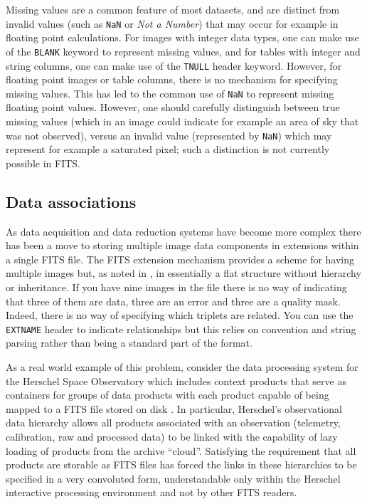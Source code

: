 \documentclass[final,authoryear,5p,times,twocolumn]{elsarticle}
\begin{document}
{{Missing values are a common feature of most datasets, and are distinct from
invalid values (such as \texttt{NaN} or \textit{Not a Number}) that may occur
for example in floating point calculations. For images with integer data
types, one can make use of the \texttt{BLANK} keyword to represent missing
values, and for tables with integer and string columns, one can make use of
the \texttt{TNULL} header keyword. However, for floating point images or
table columns, there is no mechanism for specifying missing values. This has
led to the common use of \texttt{NaN} to represent missing floating point
values. However, one should carefully distinguish between true missing values
(which in an image could indicate for example an area of sky that was not
observed), versus an invalid value (represented by \texttt{NaN}) which may
represent for example a saturated pixel; such a distinction is not currently possible
in FITS.


\subsection{Data associations}
\label{section_data_associations}


As data acquisition and data reduction systems have become more
complex there has been a move to storing multiple image data
components in extensions within a single FITS file. The FITS extension
mechanism provides a scheme for having multiple images but, as noted
in \citet{2003ASSL..285...71G}, in essentially a flat structure
without hierarchy or inheritance. If you have nine images in the file
there is no way of indicating that three of them are data, three are an error
and three are a quality mask. Indeed, there is no way of specifying which
triplets are related. You can use the \texttt{EXTNAME} header to
indicate relationships but this relies on convention and string
parsing rather than being a standard part of the format.


As a real world example of this problem, consider the data processing
system for the Herschel Space Observatory which includes
context products that serve as containers for groups of data products
with each product capable of being mapped to a
FITS file stored on disk
\citep[see the Herschel architecture and design document;][]{2008HerschelDesign}.
In particular, Herschel's observational data
hierarchy allows all products associated with an observation (telemetry,
calibration, raw and processed data) to be linked with the capability of
lazy loading of products from the archive ``cloud''.
Satisfying the requirement that all products are storable as FITS files
has forced the links in these hierarchies to be specified in a very
convoluted form, understandable only within the
Herschel interactive processing environment
\citep[HIPE;][]{2010ASPC..434..139O} and not by other FITS readers.


}}
\end{document}
